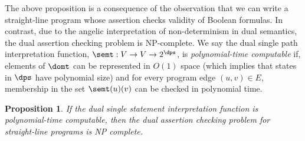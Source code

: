 \documentclass[preprint]{sig-alternate-05-2015}
\newtheorem{proposition}{Proposition}
\newcommand\ignore[1]{{}}
\def\Sig{{\Sigma}}
\def\true{{\mathit{true}}}
\def\false{{\mathit{false}}}
\begin{document}
{\ignore{
\begin{proof}(Sketch)
  By the assumptions, valid executions (sequences os states) 
  of a straight-line program of
  length $n$ can be recognized in polynomial time on $n$.
  Moreover, we can check if the last state of a given execution
  violates the assertion $x=c$ also in polynomial time.
  This shows that the primal assertion
  checking problem is in co-NP.
  To see that it is hard for this class,
  note that it is easy to write a straight-line program that
  evaluates a 3-CNF Boolean SAT instance, where we use
  assignments and the
  expression signature
  $\Sig = \{\wedge,\vee,\neg\}$ with its natural interpretation
  over the Boolean domain
  $\dom = \{ \true,\false\}$.
  If $x$ is the output of such a program, then
  the assertion $x=\false$
  holds iff the 3-SAT instance is unsatisfiable.
\end{proof}
\endignore}

The above proposition is a consequence of the observation that
we can write a straight-line program whose assertion
checks validity of Boolean formulas. %
In contrast, due to the angelic interpretation of
non-determinism in dual semantics, the
dual assertion checking problem
is NP-complete.
We say the dual single path interpretation
function, $\semt: V \rightarrow V \rightarrow 2^{\dps}$,
is {\em{polynomial-time computable}} if,
elements of $\domt$ can be represented in $O(1)$ space
(which implies that states in $\dps$ have polynomial size) 
and for every program edge $(u,v)\in E$,
membership in the set $\semt(u)(v)$ can be checked in polynomial time.

\begin{proposition}\label{prop:NPC}
  If the dual single statement interpretation function
  is polynomial-time computable,
  then the dual assertion checking problem for
  straight-line programs is NP complete.
\end{proposition}

}
\end{document}
